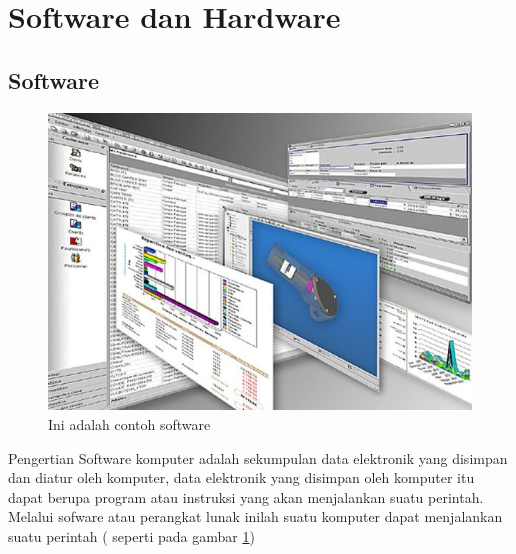 \section{Software dan Hardware}
\subsection {Software}
\begin{figure}[!htbp]
  \centering
  \includegraphics[width=.75\textwidth]{figures/software/software.jpg}
  \caption{Ini adalah contoh software}\label{fig:software}
\end{figure}

Pengertian Software komputer adalah sekumpulan data elektronik yang disimpan dan diatur oleh komputer, data elektronik yang disimpan oleh komputer itu dapat berupa program atau instruksi yang akan menjalankan suatu perintah. Melalui sofware atau perangkat lunak inilah suatu komputer dapat menjalankan suatu perintah ( seperti pada gambar \ref{fig:software})



